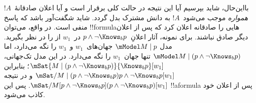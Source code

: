 \documentclass[../../../include/open-logic-section]{subfiles}
\begin{document}
بااین‌حال، شاید بپرسیم آیا این نتیجه در حالت کلی برقرار است و آیا اعلان
صادقانهٔ~$!A$ \emph{همواره} موجب می‌شود~$!A$ به دانش مشترک بدل گردد.
شاید شگفت‌آور باشد که پاسخ منفی است. در واقع، می‌توان !!{formula}هایی
را صادقانه اعلان کرد که پس از اعلان دیگر صادق نباشند. برای نمونه، آثار
اعلانِ~$p \land \lnot \Knows_b p$ در~$w_1$ از
 را در نظر بگیرید. مدل
$\mModel M \mid p$ جهان‌های~$w_1$ و~$w_3$ را نگه می‌دارد، اما
$\mModel M \mid (p \land \lnot \Knows_b p)$ تنها جهان~$w_1$ را نگه
می‌دارد. در این مدل تک‌جهانی،
$\mSat{M \mid (p \land \lnot \Knows_b p)}{\Knows_b p}[w_1]$؛ بنابراین
$\mSat/{M \mid (p \land \lnot \Knows_b p)}{p \land \lnot \Knows_b p}[w_1]$
و در نتیجه
$\mSat/{M}{[p \land \lnot \Knows_b p](p \land \lnot \Knows_b p)}[w_1]$.
پس این !!a{formula} پس از اعلان خود کاذب می‌شود.
\end{document}
